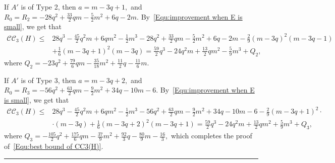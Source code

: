\documentclass[11pt,a4paper]{article}
\def\QED{\hfill \rule{7pt}{7pt}}
\newcommand{\coveropt}[2]{{\mathcal{C}\mathcal{C}_{#1}(#2)}}
\begin{document}
If $A'$ is of Type 2,
then $a=m-3q+1,$ and $R_0=R_2=-28q^2+\frac{33}{2}qm-\frac{5}{2}m^2+6q-2m.$
By~\eqref{Equ:improvement when E is small}, we get that
\begin{align*}
\coveropt{3}{H}
\leq&
28q^3-\frac{45}{2}q^2m+6qm^2-\frac{1}{2}m^3
-28q^2+\frac{33}{2}qm-\frac{5}{2}m^2+6q-2m-\frac{2}{9}(m-3q)^2(m-3q-1)\\
&+\frac{1}{6}(m-3q+1)^2(m-3q)=\frac{59} 2 q^3 - 24 q^2 m + \frac{13}{2} q m^2 - \frac{5}{9} m^3
   +Q_2,
\end{align*}
where $Q_2=-23q^2+\frac{79}{6}qm-\frac{35}{18}m^2+\frac{11}{2}q-\frac{11}{6}m.$

If $A'$ is of Type 3,
then $a=m-3q+2,$ and $R_0=R_3=-56q^2+\frac{63}{2}qm-\frac{9}{2}m^2+34q-10m-6.$
By~\eqref{Equ:improvement when E is small}, we get that
\begin{align*}
\coveropt{3}{H}
\leq&
28q^3-\frac{45}{2}q^2m+6qm^2-\frac{1}{2}m^3
-56q^2+\frac{63}{2}qm-\frac{9}{2}m^2+34q-10m-6
-\frac{2}{9}(m-3q+1)^2\cdot\\
&\cdot(m-3q)
+\frac{1}{6}(m-3q+2)^2(m-3q+1)
=\frac{59} 2 q^3 - 24 q^2 m + \frac{13}{2} q m^2 + \frac{5}{9} m^3
   +Q_3,
\end{align*}
where $Q_3= -\frac{105}{2}q^2+\frac{175}{6}qm-\frac{37}{9}m^2+\frac{92}{3}q-\frac{80}{9}m-\frac{16}{3},$
which completes the proof of~\eqref{Equ:best bound of CC3(H)}.
\QED
\end{document}
